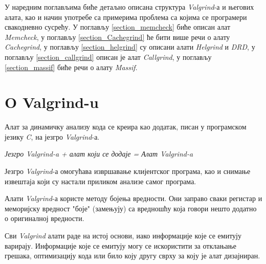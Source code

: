 \documentclass[12pt,oneside]{memoir}
\begin{document}
\indent У наредним поглављима биће детаљно описана структура \textit{Valgrind}-а и његових алата, као и начин употребе са примерима проблема са којима се програмери свакодневно сусрећу. У поглављу \ref{section_memcheck} биће описан алат \textit{Memcheck}, у поглављу \ref{section_Cachegrind} ће бити више речи о алату \textit{Cachegrind}, у поглављу \ref{section_helgrind} су описани алати \textit{Helgrind} и \textit{DRD}, у поглављу \ref{section_callgrind} описан је алат \textit{Callgrind}, у поглављу \ref{section_massif} биће речи о алату \textit{Massif}.

\section{O Valgrind-u}

\indent Алат за динамичку анализу кода се креира као додатак, писан у програмском језику \textit{C}, на језгро \textit{Valgrind}-а. 


\begin{center}
\textit{Језгро Valgrind-a + алат који се додаје = Алат Valgrind-a} 
\end{center}


\indent Језгро \textit{Valgrind}-а омогућава извршавање клијентског програма, као и снимање извештаја који су настали приликом анализе самог програма. 

\indent Алати \textit{Valgrind}-а користе методу бојења вредности. Они заправо сваки регистар и меморијску вредност "боје" (замењују) са вредношћу која говори нешто додатно о оригиналној вредности. 

\indent Сви \textit{Valgrind} алати раде на истој основи, иако информације које се емитују варирају. Информације које се емитују могу се искористити за отклањање грешака, оптимизацију кода или било коју другу сврху за коју је алат дизајниран.
\end{document}
